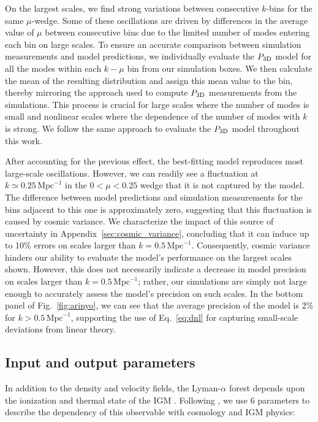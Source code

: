 \documentclass[fleqn,usenatbib]{mnras}
\newcommand{\lyaf}{Lyman-$\alpha$ forest\xspace}
\newcommand{\pthreed}{\ensuremath{P_{\rm 3D}}\xspace}
\newcommand{\iMpc}{\ensuremath{\,\mathrm{Mpc}^{-1}}}
\begin{document}
On the largest scales, we find strong variations between consecutive $k$-bins for the same $\mu$-wedge. Some of these oscillations are driven by differences in the average value of $\mu$ between consecutive bins due to the limited number of modes entering each bin on large scales. To ensure an accurate comparison between simulation measurements and model predictions, we individually evaluate the \pthreed model for all the modes within each $k-\mu$ bin from our simulation boxes. We then calculate the mean of the resulting distribution and assign this mean value to the bin, thereby mirroring the approach used to compute \pthreed measurements from the simulations. This process is crucial for large scales where the number of modes is small and nonlinear scales where the dependence of the number of modes with $k$ is strong. We follow the same approach to evaluate the \pthreed model throughout this work.

After accounting for the previous effect, the best-fitting model reproduces most large-scale oscillations. However, we can readily see a fluctuation at $k\simeq0.25\iMpc$ in the $0<\mu<0.25$ wedge that it is not captured by the model. The difference between model predictions and simulation measurements for the bins adjacent to this one is approximately zero, suggesting that this fluctuation is caused by cosmic variance. We characterize the impact of this source of uncertainty in Appendix~\ref{sec:cosmic_variance}, concluding that it can induce up to 10\% errors on scales larger than $k=0.5\iMpc$. Consequently, cosmic variance hinders our ability to evaluate the model's performance on the largest scales shown. However, this does not necessarily indicate a decrease in model precision on scales larger than $k=0.5\iMpc$; rather, our simulations are simply not large enough to accurately assess the model's precision on such scales. In the bottom panel of Fig.~\ref{fig:arinyo}, we can see that the average precision of the model is 2\% for $k>0.5\iMpc$, supporting the use of Eq.~\ref{eq:dnl} for capturing small-scale deviations from linear theory.


\subsection{Input and output parameters}
\label{sec:strategy_params}

In addition to the density and velocity fields, the \lyaf depends upon the ionization and thermal state of the IGM \citep[e.g.;][]{mcdonald2003MeasurementCosmologicalGeometry}. Following \citet{Pedersen2021}, we use 6 parameters to describe the dependency of this observable with cosmology and IGM physics:
\end{document}
